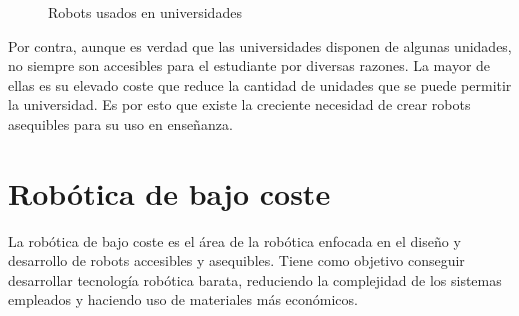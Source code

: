 \begin{figure} [ht!]
  \centering    
  \hspace{1cm}
  \caption{Robots usados en universidades}
  \label{fig:robots_universidades}
\end{figure}

Por contra, aunque es verdad que las universidades disponen de algunas unidades, no siempre son accesibles para el 
estudiante por diversas razones. La mayor de ellas es su elevado coste que reduce la cantidad de unidades que se puede 
permitir la universidad. Es por esto que existe la creciente necesidad de crear robots asequibles para su uso en enseñanza.


\section{Robótica de bajo coste}
\label{sec:rob_bajo:coste}
\noindent La robótica de bajo coste es el área de la robótica enfocada en el diseño y desarrollo de robots 
accesibles y asequibles. Tiene como objetivo conseguir desarrollar tecnología robótica
barata, reduciendo la complejidad de los sistemas empleados y haciendo uso de materiales más económicos.

